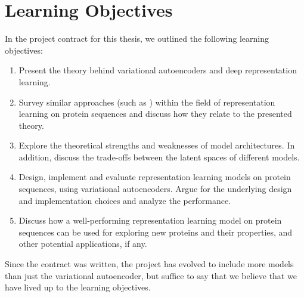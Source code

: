 \section{Learning Objectives}
In the project contract for this thesis, we outlined the following learning objectives:

\begin{enumerate}
    \item Present the theory behind variational autoencoders and deep representation learning.
    \item Survey similar approaches (such as \cite{alley2019unified}) within the field of representation learning on protein sequences and discuss how they relate to the presented theory.
    \item Explore the theoretical strengths and weaknesses of model architectures. In addition, discuss the trade-offs between the latent spaces of different models.
    \item Design, implement and evaluate representation learning models on protein sequences, using variational autoencoders. Argue for the underlying design and implementation choices and analyze the performance.
    \item Discuss how a well-performing representation learning model on protein sequences can be used for exploring new proteins and their properties, and other potential applications, if any.
\end{enumerate}

Since the contract was written, the project has evolved to include more models than just the variational autoencoder, but suffice to say that we believe that we have lived up to the learning objectives.


